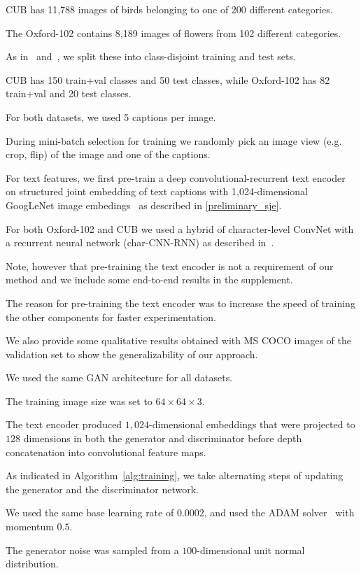 CUB has 11,788 images of birds belonging to one of 200 different categories.

The Oxford-102 contains 8,189 images of flowers from 102 different categories.

As in~\citet{ARWLS15} and~\citet{reed2015learning}, we split these into class-disjoint training and test sets.

CUB has 150 train+val classes and 50 test classes, while Oxford-102 has 82 train+val and 20 test classes.

For both datasets, we used 5 captions per image.

During mini-batch selection for training we randomly pick an image view (e.g. crop, flip) of the image and one of the captions. 

For text features, we first pre-train a deep convolutional-recurrent text encoder on structured joint embedding of text captions with 1,024-dimensional GoogLeNet image embedings~\cite{szegedy2015going} as described in \autoref{preliminary_sje}.

For both Oxford-102 and CUB we used a hybrid of character-level ConvNet with a recurrent neural network (char-CNN-RNN) as described in~\cite{reed2015learning}.

Note, however that pre-training the text encoder is not a requirement of our method and we include some end-to-end results in the supplement.

The reason for pre-training the text encoder was to increase the speed of training the other components for faster experimentation.

We also provide some qualitative results obtained with MS COCO images of the validation set to show the generalizability of our approach.

We used the same GAN architecture for all datasets.

The training image size was set to $64 \times 64 \times 3$.

The text encoder produced $1,024$-dimensional embeddings that were projected to $128$ dimensions in both the generator and discriminator before depth concatenation into convolutional feature maps.

As indicated in Algorithm~\autoref{alg:training}, we take alternating steps of updating the generator and the discriminator network.

We used the same base learning rate of $0.0002$, and used the ADAM solver~\cite{Ba_ICLR_2015} with momentum $0.5$.

The generator noise was sampled from a $100$-dimensional unit normal distribution.


